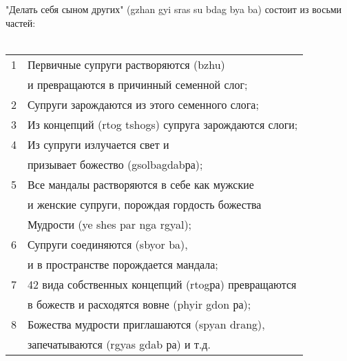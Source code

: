 \newpage 
"Делать себя сыном других" (gzhan gyi sras su bdag bya ba) состоит из восьми частей:\\
\\
\begin{tabular}{ll}
1 & Первичные супруги растворяются (bzhu) \\
  & и превращаются в причинный семенной слог;\\
2 & Супруги зарождаются из этого семенного слога;\\
3 & Из концепций (rtog tshogs) супруга зарождаются слоги;\\
4 & Из супруги излучается свет и \\
  & призывает божество (gsolbagdabра);\\
5 & Все мандалы растворяются в себе как мужские \\
  & и женские супруги, порождая гордость божества \\
  & Мудрости (ye shes par nga rgyal);\\
6 & Супруги соединяются (sbyor ba), \\
  & и в пространстве порождается мандала;\\
7 & 42 вида собственных концепций (rtogра) превращаются\\
  &  в божеств и расходятся вовне (phyir gdon ра);\\
8 & Божества мудрости приглашаются (spyan drang), \\
  & запечатываются (rgyas gdab ра) и т.д.\\
\end{tabular}

